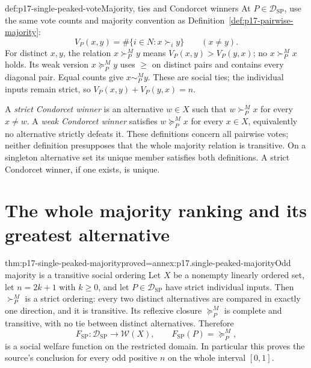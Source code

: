 \begin{hbdefinition}{def:p17-single-peaked-vote}{Majority, ties and Condorcet winners}
At \(P\in\mathcal D_{\mathrm{SP}}\), use the same vote counts and
majority convention as Definition~\ref{def:p17-pairwise-majority}:
\[
 V_P(x,y)=\#\{i\in N:x\succ_i y\}\qquad(x\ne y).
\]
For distinct \(x,y\), the relation \(x\succ^M_P y\) means
\(V_P(x,y)>V_P(y,x)\); no \(x\succ^M_Px\) holds.
Its weak version \(x\succeq^M_Py\)
uses \(\geq\) on distinct pairs and contains every diagonal pair.
Equal counts give \(x\sim^M_Py\). These are social ties; the
individual inputs remain strict, so
\(V_P(x,y)+V_P(y,x)=n\).

A \emph{strict Condorcet winner} is an alternative \(w\in X\)
such that \(w\succ^M_Px\) for every \(x\ne w\).
A \emph{weak Condorcet winner} satisfies \(w\succeq^M_Px\) for
every \(x\in X\), equivalently no alternative strictly defeats it.
These definitions concern all pairwise votes; neither definition
presupposes that the whole majority relation is transitive.
On a singleton alternative set its unique member satisfies both
definitions. A strict Condorcet winner, if one exists, is unique.
\end{hbdefinition}

\section{The whole majority ranking and its greatest alternative}
\label{sec:p17-single-peaked-theorems}

\begin{hbtheorem}{thm:p17-single-peaked-majority}{proved=annex:p17.single-peaked-majority}{Odd majority is a transitive social ordering}
Let \(X\) be a nonempty linearly ordered set, let \(n=2k+1\) with
\(k\geq0\), and let \(P\in\mathcal D_{\mathrm{SP}}\) have strict
individual inputs. Then \(\succ^M_P\) is a strict ordering: every two
distinct alternatives are compared in exactly one direction, and it is
transitive. Its reflexive closure \(\succeq^M_P\) is complete and
transitive, with no tie between distinct alternatives. Therefore
\[
 F_{\mathrm{SP}}:\mathcal D_{\mathrm{SP}}\longrightarrow\mathcal W(X),
 \qquad F_{\mathrm{SP}}(P)=\succeq^M_P,
\]
is a social welfare function on the restricted domain. In particular
this proves the source's conclusion for every odd positive \(n\) on
the whole interval \([0,1]\).
\end{hbtheorem}

